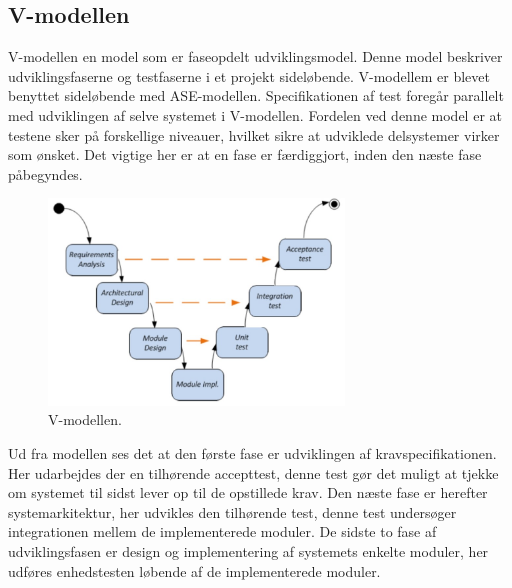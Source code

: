 \subsection{V-modellen}
V-modellen en model som er faseopdelt udviklingsmodel. Denne model beskriver udviklingsfaserne og testfaserne i et projekt sideløbende. V-modellem er blevet benyttet sideløbende med ASE-modellen. Specifikationen af test foregår parallelt med udviklingen af selve systemet i V-modellen. Fordelen ved denne model er at testene sker på forskellige niveauer, hvilket sikre at udviklede delsystemer virker som ønsket. Det vigtige her er at en fase er færdiggjort, inden den næste fase påbegyndes. 
\begin{figure}[H]
\includegraphics[width =0.7\textwidth , center]{billeder/Vmodel}
\caption{V-modellen.}
\end{figure} 
Ud fra modellen ses det at den første fase er udviklingen af kravspecifikationen. Her udarbejdes der en tilhørende accepttest, denne test gør det muligt at tjekke om systemet til sidst lever op til de opstillede krav. Den næste fase er herefter systemarkitektur, her udvikles den tilhørende test, denne test undersøger integrationen mellem de implementerede moduler. De sidste to fase af udviklingsfasen er design og implementering af systemets enkelte moduler, her udføres enhedstesten løbende af de implementerede moduler.
